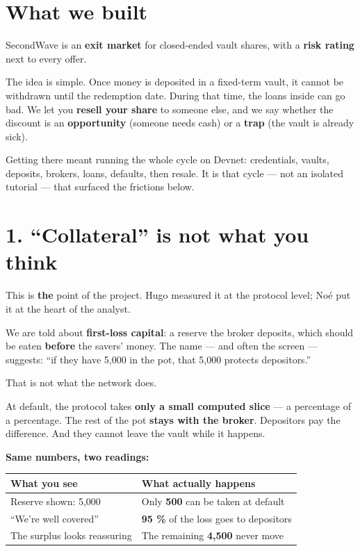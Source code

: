 \documentclass[10pt,a4paper]{article}
\begin{document}
\section*{What we built}

SecondWave is an \textbf{exit market} for closed-ended vault shares, with a \textbf{risk rating} next to every offer.

The idea is simple. Once money is deposited in a fixed-term vault, it cannot be withdrawn until the redemption date. During that time, the loans inside can go bad. We let you \textbf{resell your share} to someone else, and we say whether the discount is an \textbf{opportunity} (someone needs cash) or a \textbf{trap} (the vault is already sick).

Getting there meant running the whole cycle on Devnet: credentials, vaults, deposits, brokers, loans, defaults, then resale. It is that cycle --- not an isolated tutorial --- that surfaced the frictions below.

\vspace{4pt}

\section*{1. ``Collateral'' is not what you think}

This is \textbf{the} point of the project. Hugo measured it at the protocol level; Noé put it at the heart of the analyst.

We are told about \textbf{first-loss capital}: a reserve the broker deposits, which should be eaten \textbf{before} the savers' money. The name --- and often the screen --- suggests: ``if they have 5,000 in the pot, that 5,000 protects depositors.''

That is not what the network does.

At default, the protocol takes \textbf{only a small computed slice} --- a percentage of a percentage. The rest of the pot \textbf{stays with the broker}. Depositors pay the difference. And they cannot leave the vault while it happens.

\textbf{Same numbers, two readings:}

\vspace{3pt}
\begin{tabularx}{\linewidth}{lX}
\toprule
\textbf{What you see} & \textbf{What actually happens} \\
\midrule
Reserve shown: 5,000 & Only \textbf{500} can be taken at default \\
``We're well covered'' & \textbf{95 \%} of the loss goes to depositors \\
The surplus looks reassuring & The remaining \textbf{4,500} never move \\
\bottomrule
\end{tabularx}
\vspace{3pt}
\end{document}
